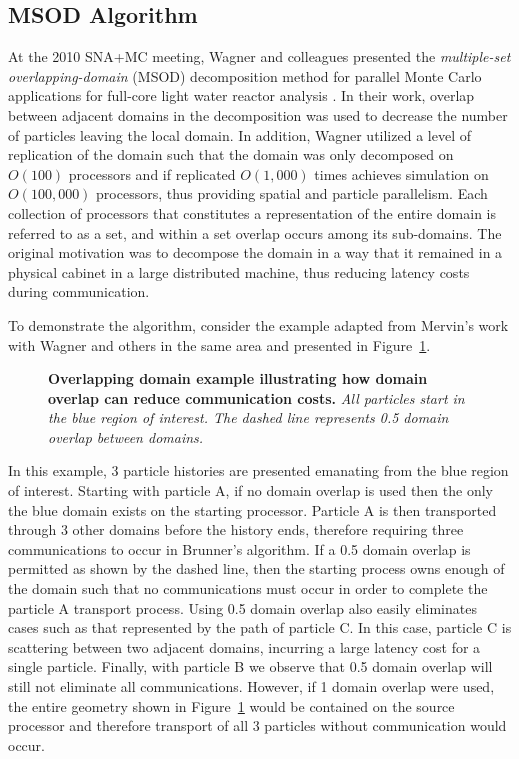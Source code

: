\documentclass{snamc2013}
\begin{document}
\subsection{MSOD Algorithm}
At the 2010 SNA+MC meeting, Wagner and colleagues presented the
\textit{multiple-set overlapping-domain} (MSOD) decomposition method
for parallel Monte Carlo applications for full-core light water
reactor analysis \cite{wagner_hybrid_2010}. In their work, overlap
between adjacent domains in the decomposition was used to decrease the
number of particles leaving the local domain. In addition, Wagner
utilized a level of replication of the domain such that the domain was
only decomposed on $O(100)$ processors and if replicated $O(1,000)$
times achieves simulation on $O(100,000)$ processors, thus providing
spatial and particle parallelism. Each collection of processors that
constitutes a representation of the entire domain is referred to as a
set, and within a set overlap occurs among its sub-domains. The
original motivation was to decompose the domain in a way that it
remained in a physical cabinet in a large distributed machine, thus
reducing latency costs during communication.

To demonstrate the algorithm, consider the example adapted from
Mervin's work with Wagner and others in the same area
\cite{mervin_variance_2012} and presented in
Figure~\ref{fig:msod_example}.
\begin{figure}[h!]
  \begin{center}
    \scalebox{0.8}{  }
  \end{center}
  \caption{\textbf{Overlapping domain example illustrating how domain
      overlap can reduce communication costs.}
    \textit{All particles start in the blue region of interest. The
      dashed line represents 0.5 domain overlap between domains.}}
  \label{fig:msod_example}
\end{figure}
In this example, 3 particle histories are presented emanating from the
blue region of interest. Starting with particle A, if no domain
overlap is used then the only the blue domain exists on the starting
processor. Particle A is then transported through 3 other domains
before the history ends, therefore requiring three communications to
occur in Brunner's algorithm. If a 0.5 domain overlap is permitted as
shown by the dashed line, then the starting process owns enough of the
domain such that no communications must occur in order to complete the
particle A transport process. Using 0.5 domain overlap also easily
eliminates cases such as that represented by the path of particle
C. In this case, particle C is scattering between two adjacent
domains, incurring a large latency cost for a single
particle. Finally, with particle B we observe that 0.5 domain overlap
will still not eliminate all communications. However, if 1 domain
overlap were used, the entire geometry shown in
Figure~\ref{fig:msod_example} would be contained on the source
processor and therefore transport of all 3 particles without
communication would occur.
\end{document}
